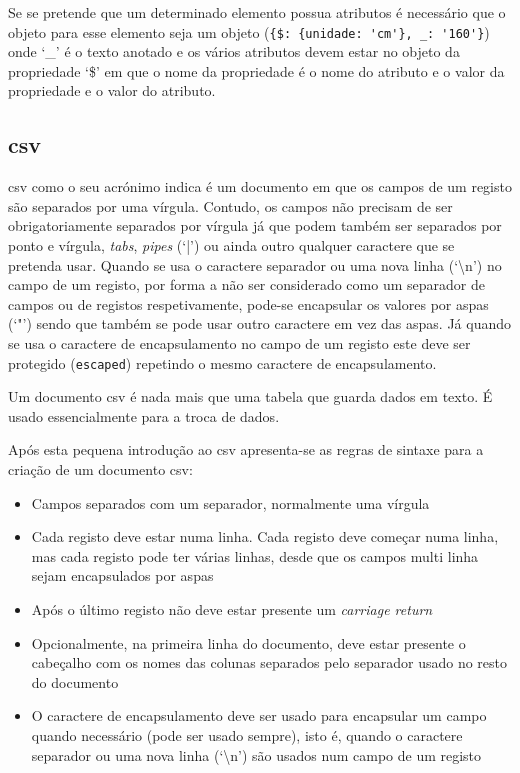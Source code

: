 Se se pretende que um determinado elemento possua atributos é necessário que o objeto para esse elemento seja um objeto (\verb|{$: {unidade: 'cm'}, _: '160'}|) onde `\_' é o texto anotado e os vários atributos devem estar no objeto da propriedade `\$' em que o nome da propriedade é o nome do atributo e o valor da propriedade e o valor do atributo.

\subsection{\acrshort{csv}}

\acrfull{csv} como o seu acrónimo indica é um documento em que os campos de um registo são separados por uma vírgula. Contudo, os campos não precisam de ser obrigatoriamente separados por vírgula já que podem também ser separados por ponto e vírgula, \textit{tabs}, \textit{pipes} (`|') ou ainda outro qualquer caractere que se pretenda usar. Quando se usa o caractere separador ou uma nova linha (`\backslash{}n') no campo de um registo, por forma a não ser considerado como um separador de campos ou de registos respetivamente, pode-se encapsular os valores por aspas (`"') sendo que também se pode usar outro caractere em vez das aspas. Já quando se usa o caractere de encapsulamento no campo de um registo este deve ser protegido (\texttt{escaped}) repetindo o mesmo caractere de encapsulamento.

Um documento \acrshort{csv} é nada mais que uma tabela que guarda dados em texto. É usado essencialmente para a troca de dados.

Após esta pequena introdução ao \acrshort{csv} apresenta-se as regras de sintaxe para a criação de um documento \acrshort{csv}:
\begin{itemize}
    \item Campos separados com um separador, normalmente uma vírgula
    \item Cada registo deve estar numa linha. Cada registo deve começar numa linha, mas cada registo pode ter várias linhas, desde que os campos multi linha sejam encapsulados por aspas
    \item Após o último registo não deve estar presente um \textit{carriage return}
    \item Opcionalmente, na primeira linha do documento, deve estar presente o cabeçalho com os nomes das colunas separados pelo separador usado no resto do documento
    \item O caractere de encapsulamento deve ser usado para encapsular um campo quando necessário (pode ser usado sempre), isto é, quando o caractere separador ou uma nova linha (`\backslash{}n') são usados num campo de um registo
\end{itemize}

